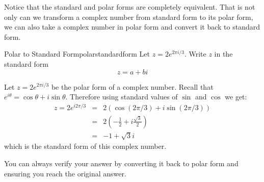 Notice that the standard and polar forms are completely equivalent. That is not only can we transform a complex number from standard form
to its polar form, we can also take a complex number in polar form and
convert it back to standard form.

\begin{example}{Polar to Standard Form}{polarstandardform}
Let $z = 2 e^{ 2\pi i/3}$. Write $z$ in the standard form 
\begin{equation*}
z = a+bi
\end{equation*}
\end{example}

\begin{solution}
Let $z = 2 e^{2\pi i/3}$ be the polar form of a complex number. Recall that 
$e^{i\theta} = \cos \theta + i \sin \theta$. Therefore using standard values of $\sin$ and $\cos$ we get:
\begin{eqnarray*}
z = 2 e^{i 2\pi/3} &=& 2 (\cos (2\pi/3)+i\sin (2\pi/3))\\
&=& 2 \left ( -\frac{1}{2} + i \frac{\sqrt{3}}{2} \right) \\
&=&-1 + \sqrt{3}i 
\end{eqnarray*}
which is the standard form of this complex number.
\end{solution}

You can always verify your answer by converting it back to polar form and ensuring you reach the original answer. 
